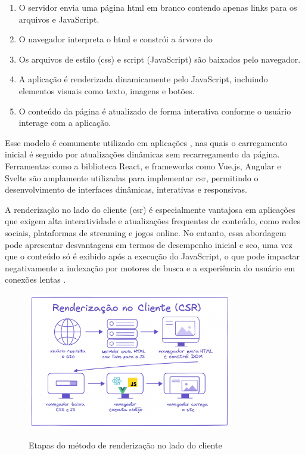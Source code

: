 \begin{enumerate}
    \item O servidor envia uma página \acrshort{html} em branco contendo apenas links para os arquivos  e JavaScript.
    \item O navegador interpreta o \acrshort{html} e constrói a árvore do 
    \item Os arquivos de estilo (\acrshort{css}) e script (JavaScript) são baixados pelo navegador.
    \item A aplicação é renderizada dinamicamente pelo JavaScript, incluindo elementos visuais como texto, imagens e botões.
    \item O conteúdo da página é atualizado de forma interativa conforme o usuário interage com a aplicação.
\end{enumerate}

Esse modelo é comumente utilizado em aplicações , nas quais o carregamento inicial é seguido por atualizações dinâmicas sem recarregamento da página. Ferramentas como a biblioteca React, e frameworks como Vue.js, Angular e Svelte são amplamente utilizadas para implementar \acrshort{csr}, permitindo o desenvolvimento de interfaces dinâmicas, interativas e responsivas.


A renderização no lado do cliente (\acrshort{csr}) é especialmente vantajosa em aplicações que exigem alta interatividade e atualizações frequentes de conteúdo, como redes sociais, plataformas de streaming e jogos online. No entanto, essa abordagem pode apresentar desvantagens em termos de desempenho inicial e \acrshort{seo}, uma vez que o conteúdo só é exibido após a execução do JavaScript, o que pode impactar negativamente a indexação por motores de busca e a experiência do usuário em conexões lentas \cite{atori2024}.

\begin{figure}[h!]
    \centering
    \caption{Etapas do método de renderização no lado do cliente}
    \includegraphics[width=0.8\textwidth]{media/client_side_rendering.png}
    \label{fig:client_side_rendering}
\end{figure}


